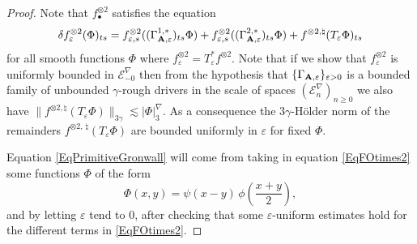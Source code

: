 \documentclass[11pt,a4paper]{amsart}
\newcommand{\mcE}{\mathcal{E}}
\renewcommand{\geq}{\geqslant}
\theoremstyle{plain}%
\theoremstyle{definition}
\theoremstyle{remark}
\numberwithin{equation}{section} %
\begin{document}
\begin{proof}
Note that $f_\bullet^{\otimes 2}$ satisfies the equation
\begin{equation}
\label{EqFOtimes2}
\delta f^{\otimes 2}_\varepsilon (\Phi)_{ts} = f^{\otimes 2}_{\varepsilon,s}((\Gamma_{\bf A,\varepsilon}^{1,*})_{ts}\Phi) +f^{\otimes 2}_{\varepsilon,s} ( (\Gamma_{\bf A,\varepsilon}^{2,*})_{ts}\Phi) +  f^{\otimes 2,\natural}( T_\varepsilon\Phi)_{ts}
\end{equation}
for all smooth functions $\Phi$ where $f^{\otimes 2}_\varepsilon = T^*_\varepsilon f^{\otimes 2}$.
Note that if we show that $f^{\otimes 2}_\varepsilon$ is uniformly bounded in $\mcE^\nabla_{-0}$ then from the hypothesis that  $\{\Gamma_{\bf A,\varepsilon}\}_{\varepsilon>0}$ is a bounded family of unbounded $\gamma$-rough drivers in the scale of spaces $(\mcE^\nabla_n)_{n\geq 0}$ we also have
 $\|f^{\otimes 2,\natural}(T_\varepsilon \Phi)\|_{3\gamma}\lesssim | \Phi|^\nabla_3$. As a consequence the $3\gamma$-H\"older norm of the remainders $f^{\otimes 2,\,\natural}(T_\varepsilon \Phi)$ are bounded uniformly in  $\varepsilon$ for fixed $\Phi$. 

Equation \eqref{EqPrimitiveGronwall} will come from taking in equation \eqref{EqFOtimes2} some functions $\Phi$ of the form
$$
\Phi(x,y) = \psi(x-y)\,\phi\left(\frac{x+y}{2}\right),
$$
and by letting $\varepsilon$ tend to $0$, after checking that some $\varepsilon$-uniform estimates hold for the different terms in \eqref{EqFOtimes2}.


\end{proof}
\end{document}
